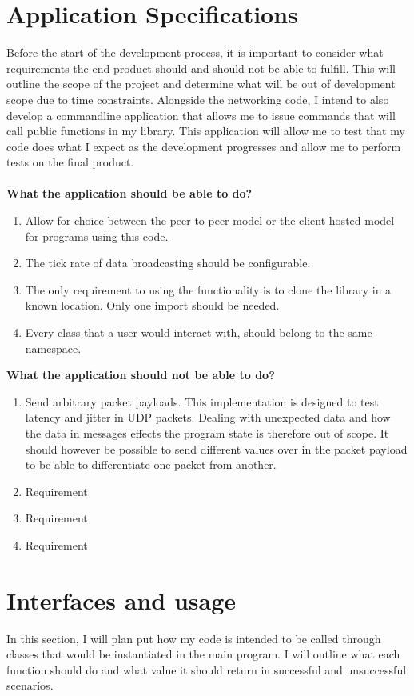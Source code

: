 \section{Application Specifications}
Before the start of the development process, it is important to consider what requirements the end product should and should not be able to fulfill. This will outline the scope of the project and determine what will be out of development scope due to time constraints. Alongside the networking code, I intend to also develop a commandline application that allows me to issue commands that will call public functions in my library. This application will allow me to test that my code does what I expect as the development progresses and allow me to perform tests on the final product.
\\
\\
\textbf{What the application should be able to do?}
\begin{enumerate}
\item Allow for choice between the peer to peer model or the client hosted model for programs using this code.
\item The tick rate of data broadcasting should be configurable.
\item The only requirement to using the functionality is to clone the library in a known location. Only one import should be needed.
\item Every class that a user would interact with, should belong to the same namespace.
\end{enumerate}
\textbf{What the application should not be able to do?}
\begin{enumerate}
\item Send arbitrary packet payloads. This implementation is designed to test latency and jitter in UDP packets. Dealing with unexpected data and how the data in messages effects the program state is therefore out of scope. It should however be possible to send different values over in the packet payload to be able to differentiate one packet from another.
\item Requirement
\item Requirement
\item Requirement
\end{enumerate}

\newpage
\section{Interfaces and usage}
In this section, I will plan put how my code is intended to be called through classes that would be instantiated in the main program. I will outline what each function should do and what value it should return in successful and unsuccessful scenarios.


